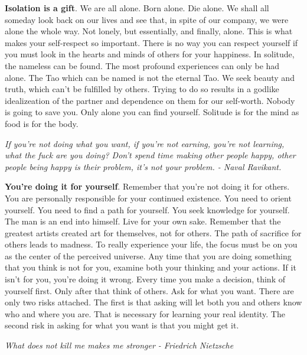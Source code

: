 \documentclass[a4paper,hidelinks]{article}
\begin{document}
\textbf{Isolation is a gift}.
We are all alone.
Born alone.
Die alone.
We shall all someday look back on our lives and see that, in spite of our company, we were alone the whole way.
Not lonely, but essentially, and finally, alone.
This is what makes your self-respect so important.
There is no way you can respect yourself if you must look in the hearts and minds of others for your happiness.
In solitude, the nameless can be found.
The most profound experiences can only be had alone.
The Tao which can be named is not the eternal Tao.
We seek beauty and truth, which can't be fulfilled by others.
Trying to do so results in a godlike idealizeation of the partner and dependence on them for our self-worth.
Nobody is going to save you.
Only alone you can find yourself.
Solitude is for the mind as food is for the body.

\newpage

\begin{center}
\textit{If you're not doing what you want, if you're not earning, you're not learning, what the fuck are you doing? Don't spend time making other people happy, other people being happy is their problem, it's not your problem. - Naval Ravikant.}
\end{center}

\textbf{You're doing it for yourself}.
Remember that you're not doing it for others.
You are personally responsible for your continued existence.
You need to orient yourself.
You need to find a path for yourself.
You seek knowledge for yourself.
The man is an end into himself.
Live for your own sake.
Remember that the greatest artists created art for themselves, not for others.
The path of sacrifice for others leads to madness.
To really experience your life, the focus must be on you as the center of the perceived universe.
Any time that you are doing something that you think is not for you, examine both your thinking and your actions.
If it isn't for you, you’re doing it wrong.
Every time you make a decision, think of yourself first.
Only after that think of others.
Ask for what you want.
There are only two risks attached.
The first is that asking will let both you and others know who and where you are.
That is necessary for learning your real identity.
The second risk in asking for what you want is that you might get it.

\newpage

\begin{center}
\textit{What does not kill me makes me stronger - Friedrich Nietzsche}
\end{center}
\end{document}
